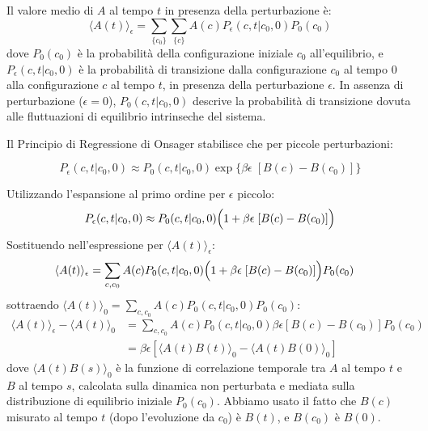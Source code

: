 Il valore medio di $A$ al tempo $t$ in presenza della perturbazione è:
\begin{equation}
\langle A(t)\rangle_{\epsilon}=\sum_{\{c_{0}\}}\sum_{\{c\}}A(c)P_{\epsilon}(c,t|c_{0},0)P_{0}(c_{0})
\end{equation}
dove $P_0(c_0)$ è la probabilità della configurazione iniziale $c_0$ all'equilibrio, e $P_{\epsilon}(c,t|c_{0},0)$ è la probabilità di transizione dalla configurazione $c_0$ al tempo $0$ alla configurazione $c$ al tempo $t$, in presenza della perturbazione $\epsilon$.
In assenza di perturbazione ($\epsilon=0$), $P_{0}(c,t|c_{0},0)$ descrive la probabilità di transizione dovuta alle fluttuazioni di equilibrio intrinseche del sistema.

\noindent Il Principio di Regressione di Onsager stabilisce che per piccole perturbazioni:

\begin{tcolorbox}[colback=colorA!5, colframe=colorA, arc=3mm, boxrule=1.2pt]
\begin{equation}
P_{\epsilon}(c,t|c_{0},0) \approx P_{0}(c,t|c_{0},0) \exp\{\beta\epsilon \;[B(c) - B(c_0)]\}
\end{equation}
\end{tcolorbox}

Utilizzando l'espansione al primo ordine per $\epsilon$ piccolo:
\begin{equation}
P_{\epsilon}(c,t|c_{0},0) \approx P_{0}(c,t|c_{0},0) \Bigl(1+\beta\epsilon \; [B(c) -  B (c_0)]\Bigr)
\end{equation}
Sostituendo nell'espressione per $\langle A(t)\rangle_{\epsilon}$:
\begin{align}
\langle A(t)\rangle_{\epsilon} &= \sum_{c,c_{0}}A(c)P_{0}(c,t|c_{0},0)\Bigl(1+\beta\epsilon \; [B(c) -  B (c_0)]\Bigr)P_0(c_0)
\end{align}
sottraendo $\langle A(t)\rangle_{0} = \sum_{c,c_0} A(c) P_0(c,t|c_0,0) P_0(c_0)$:
\begin{align}
\langle A(t)\rangle_{\epsilon}-\langle A(t)\rangle_{0} &= \sum_{c,c_{0}}A(c)P_{0}(c,t|c_{0},0)\beta\epsilon[B(c)-B(c_{0})]P_{0}(c_{0}) \nonumber \\
&= \beta\epsilon [\langle A(t)B(t)\rangle_{0} - \langle A(t)B(0)\rangle_{0}] \label{eq:risposta_lineare}
\end{align}
dove $\langle A(t)B(s) \rangle_0$ è la funzione di correlazione temporale tra $A$ al tempo $t$ e $B$ al tempo $s$, calcolata sulla dinamica non perturbata e mediata sulla distribuzione di equilibrio iniziale $P_0(c_0)$.
Abbiamo usato il fatto che $B(c)$ misurato al tempo $t$ (dopo l'evoluzione da $c_0$) è $B(t)$, e $B(c_0)$ è $B(0)$.

